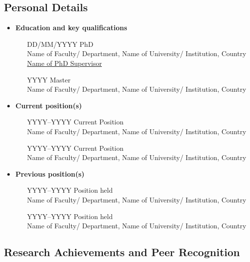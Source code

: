 \bigskip

\subsection*{Personal Details}


\begin{itemize}
  \item \textbf{Education and key qualifications}
  \begin{itemize}
    \item[DD/MM/YYYY] PhD \\
      Name of Faculty/ Department, Name of University/ Institution, Country\\
      \underline{Name of PhD Supervisor}
    \item[YYYY] Master \\
      Name of Faculty/ Department, Name of University/ Institution, Country
  \end{itemize}
  \item \textbf{Current position(s)}
  \begin{itemize}
    \item[YYYY--YYYY] Current Position \\
    Name of Faculty/ Department, Name of University/ Institution, Country
    \item[YYYY--YYYY] Current Position \\
    Name of Faculty/ Department, Name of University/ Institution, Country
  \end{itemize}
  \item \textbf{Previous position(s)}
  \begin{itemize}
    \item[YYYY--YYYY] Position held \\
    Name of Faculty/ Department, Name of University/ Institution, Country
    \item[YYYY--YYYY] Position held \\
    Name of Faculty/ Department, Name of University/ Institution, Country
  \end{itemize}
\end{itemize}

\subsection*{Research Achievements and Peer Recognition}

